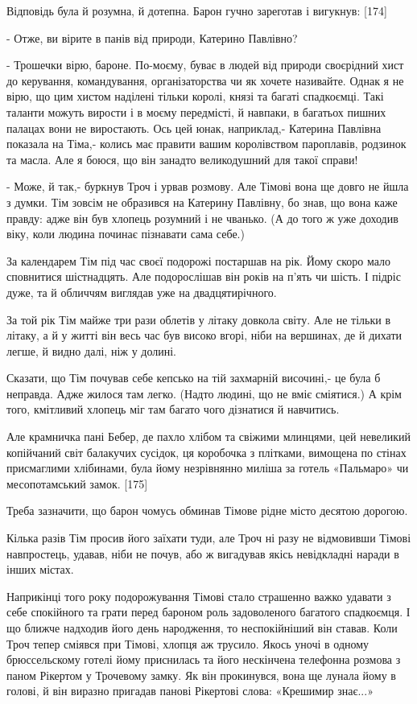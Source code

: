 Відповідь була й розумна, й дотепна. Барон гучно зареготав і вигукнув: [174]

- Отже, ви вірите в панів від природи, Катерино Павлівно?

- Трошечки вірю, бароне. По-моєму, буває в людей від природи своєрідний хист до керування, командування, організаторства чи як хочете називайте. Однак я не вірю, що цим хистом наділені тільки королі, князі та багаті спадкоємці. Такі таланти можуть вирости і в моєму передмісті, й навпаки, в багатьох пишних палацах вони не виростають. Ось цей юнак, наприклад,- Катерина Павлівна показала на Тіма,- колись має правити вашим королівством пароплавів, родзинок та масла. Але я боюся, що він занадто великодушний для такої справи!

- Може, й так,- буркнув Троч і урвав розмову. Але Тімові вона ще довго не йшла з думки. Тім зовсім не образився на Катерину Павлівну, бо знав, що вона каже правду: адже він був хлопець розумний і не чванько. (А до того ж уже доходив віку, коли людина починає пізнавати сама себе.)

За календарем Тім під час своєї подорожі постаршав на рік. Йому скоро мало сповнитися шістнадцять. Але подорослішав він років на п'ять чи шість. І підріс дуже, та й обличчям виглядав уже на двадцятирічного.

За той рік Тім майже три рази облетів у літаку довкола світу. Але не тільки в літаку, а й у житті він весь час був високо вгорі, ніби на вершинах, де й дихати легше, й видно далі, ніж у долині.

Сказати, що Тім почував себе кепсько на тій захмарній височині,- це була б неправда. Адже жилося там легко. (Надто людині, що не вміє сміятися.) А крім того, кмітливий хлопець міг там багато чого дізнатися й навчитись.

Але крамничка пані Бебер, де пахло хлібом та свіжими млинцями, цей невеликий копійчаний світ балакучих сусідок, ця коробочка з плітками, вимощена по стінах присмаглими хлібинами, була йому незрівнянно миліша за готель «Пальмаро» чи месопотамський замок. [175]

Треба зазначити, що барон чомусь обминав Тімове рідне місто десятою дорогою.

Кілька разів Тім просив його заїхати туди, але Троч ні разу не відмовивши Тімові навпростець, удавав, ніби не почув, або ж вигадував якісь невідкладні наради в інших містах.

Наприкінці того року подорожування Тімові стало страшенно важко удавати з себе спокійного та грати перед бароном роль задоволеного багатого спадкоємця. І що ближче надходив його день народження, то неспокійніший він ставав. Коли Троч тепер сміявся при Тімові, хлопця аж трусило. Якось уночі в одному брюссельскому готелі йому приснилась та його нескінчена телефонна розмова з паном Рікертом у Трочевому замку. Як він прокинувся, вона ще лунала йому в голові, й він виразно пригадав панові Рікертові слова: «Крешимир знає...»

